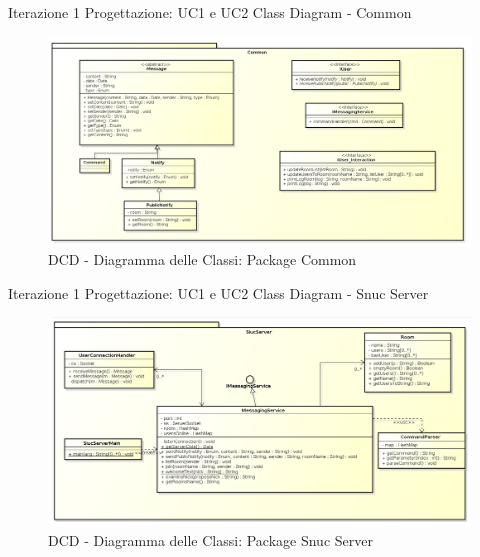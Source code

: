 \documentclass[t]{beamer} %
\begin{document}
\begin{frame} {Iterazione 1 Progettazione: UC1 e UC2 Class Diagram - Common}
   \begin{figure}
     \includegraphics[scale=0.26]{image_astah/Iteration_1_DesignModel/ClassDiagramCommon.png}{\centering}
     \caption{DCD - Diagramma delle Classi: Package Common }
     \label{fig_UC1_UC2_DCD_1} 
   \end{figure}
\end{frame}

\begin{frame} {Iterazione 1 Progettazione: UC1 e UC2 Class Diagram - Snuc Server}
   \begin{figure}
     \includegraphics[scale=0.28]{image_astah/Iteration_1_DesignModel/ClassDiagramSnucServer.png}{\centering}
     \caption{DCD - Diagramma delle Classi: Package Snuc Server }
     \label{fig_UC1_UC2_DCD_2} 
   \end{figure}
\end{frame}
\end{document}
